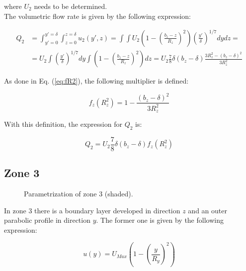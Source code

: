 where $U_2$ needs to be determined.\\

The volumetric flow rate is given by the following expression:
 
\begin{equation}
\begin{split}
Q_2 &= \int_{y'=0}^{y'=\delta} \int_{z=0}^{z=\delta} u_2 \left( y', z  \right) = \int \int U_2 \left( 1 - \left( \frac{b_z - z}{R_z} \right)^2 \right) \left( \frac{y'}{\delta} \right)^{1/7} dy dz = \\
&= U_2  \int \left( \frac{y'}{\delta} \right)^{1/7} dy \int \left( 1 - \left( \frac{b_z - z}{R_z} \right)^2 \right) dz = U_2 \frac{7}{8} \delta \left( b_z - \delta \right) \frac{3 R_z^2 - \left( b_z - \delta \right)^2}{3 R_z^2}
\end{split}
\end{equation}

As done in Eq. (\ref{eq:fR2}), the following multiplier is defined:

\begin{equation}
f_z \left( R_z^2 \right) = 1 - \frac{\left( b_z - \delta \right)^2}{3 R_z^2}
\end{equation}

With this definition, the expression for $Q_2$ is:

\begin{equation}
\label{eq:3DBL_Q2}
\boxed{
Q_2 = U_2 \frac{7}{8} \delta \left( b_z - \delta \right) f_z \left( R_z^2 \right)
}
\end{equation}

\newpage

\subsection{Zone 3}

\begin{figure}[h!]	
	\centering
%	
	\caption{Parametrization of zone 3 (shaded).}
	\label{fig:param_z3}
\end{figure}

In zone 3 there is a boundary layer developed in direction $z$ and an outer parabolic profile in direction $y$. The former one is given by the following expression:

\begin{equation}
u \left( y \right) = U_{Max} \left( 1 - \left( \frac{y}{R_y} \right)^2 \right)
\end{equation}

